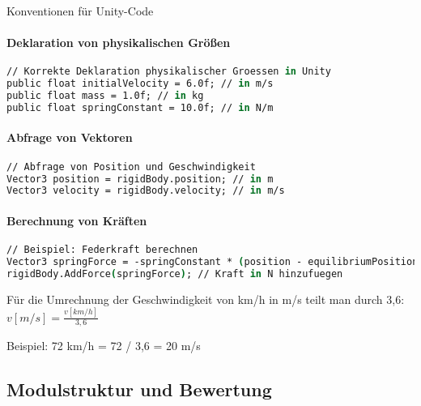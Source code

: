 \begin{KR}{Konventionen für Unity-Code}\\
    \paragraph{Deklaration von physikalischen Größen}
    \begin{lstlisting}[language=csh, style=basesmol]
// Korrekte Deklaration physikalischer Groessen in Unity
public float initialVelocity = 6.0f; // in m/s
public float mass = 1.0f; // in kg
public float springConstant = 10.0f; // in N/m
    \end{lstlisting}
    
    \paragraph{Abfrage von Vektoren}
    \begin{lstlisting}[language=csh, style=basesmol]
// Abfrage von Position und Geschwindigkeit
Vector3 position = rigidBody.position; // in m
Vector3 velocity = rigidBody.velocity; // in m/s
    \end{lstlisting}
    
    \paragraph{Berechnung von Kräften}
    \begin{lstlisting}[language=csh, style=basesmol]
// Beispiel: Federkraft berechnen
Vector3 springForce = -springConstant * (position - equilibriumPosition);
rigidBody.AddForce(springForce); // Kraft in N hinzufuegen
    \end{lstlisting}
\end{KR}

\begin{example}
    Für die Umrechnung der Geschwindigkeit von km/h in m/s teilt man durch 3,6:
    $v[m/s] = \frac{v[km/h]}{3,6}$
    
    Beispiel: 72 km/h = 72 / 3,6 = 20 m/s
\end{example}

\subsection{Modulstruktur und Bewertung}


